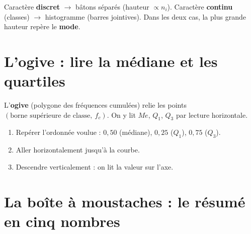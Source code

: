 \documentclass[11pt,a4paper]{article}
\newcommand{\med}{M\!e}
\begin{document}
\begin{propriete}
Caractère \textbf{discret} $\rightarrow$ bâtons séparés (hauteur $\propto n_i$).
Caractère \textbf{continu} (classes) $\rightarrow$ histogramme (barres jointives).
Dans les deux cas, la plus grande hauteur repère le \textbf{mode}.
\end{propriete}

\section{L'ogive : lire la médiane et les quartiles}

L'\textbf{ogive} (polygone des fréquences cumulées) relie les points
$(\text{borne supérieure de classe},\ f_c)$. On y lit $\med$, $Q_1$, $Q_3$ par lecture horizontale.

\begin{minipage}{0.52\textwidth}
\begin{methode}
\begin{enumerate}
  \item Repérer l'ordonnée voulue : $0{,}50$ (médiane), $0{,}25$ ($Q_1$), $0{,}75$ ($Q_3$).
  \item Aller horizontalement jusqu'à la courbe.
  \item Descendre verticalement : on lit la valeur sur l'axe.
\end{enumerate}
\end{methode}
\end{minipage}\hfill
\begin{minipage}{0.44\textwidth}
\centering
{}
\end{minipage}

\section{La boîte à moustaches : le résumé en cinq nombres}
\end{document}
